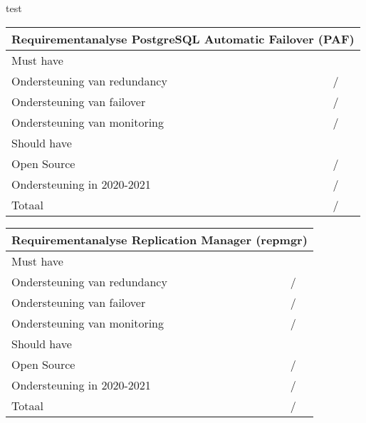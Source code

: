 \caption[Tabel 2: Requirementanalyse Pgpool-II]{test}
\newline

\begin{tabular}{ |p{6cm}||p{6cm}|  }
    \hline
    \multicolumn{2}{|c|}{Requirementanalyse PostgreSQL Automatic Failover (PAF)} \\
    \hline
    Must have & \\
    \hline
    Ondersteuning van redundancy  & / \\
    Ondersteuning van failover &  / \\
    Ondersteuning van monitoring & / \\
    \hline
    Should have & \\
    \hline
    Open Source &  / \\
    Ondersteuning in 2020-2021 & / \\
    \hline
    \hline
    Totaal & / \\
    \hline
\end{tabular}


\caption[Tabel 3: Requirementanalyse PostgreSQL Automatic Failover (PAF)]
\newline

\begin{tabular}{ |p{6cm}||p{6cm}|  }
    \hline
    \multicolumn{2}{|c|}{Requirementanalyse Replication Manager (repmgr)} \\
    \hline
    Must have & \\
    \hline
    Ondersteuning van redundancy  & / \\
    Ondersteuning van failover &  / \\
    Ondersteuning van monitoring & / \\
    \hline
    Should have & \\
    \hline
    Open Source &  / \\
    Ondersteuning in 2020-2021 & / \\
    \hline
    \hline
    Totaal & / \\
    \hline
\end{tabular}


\caption[Tabel 4: Requirementanalyse Replication Manager (repmgr)]
\newline




\caption[Tabel 5: Requirementanalyse alle oplossingen]
\newline
